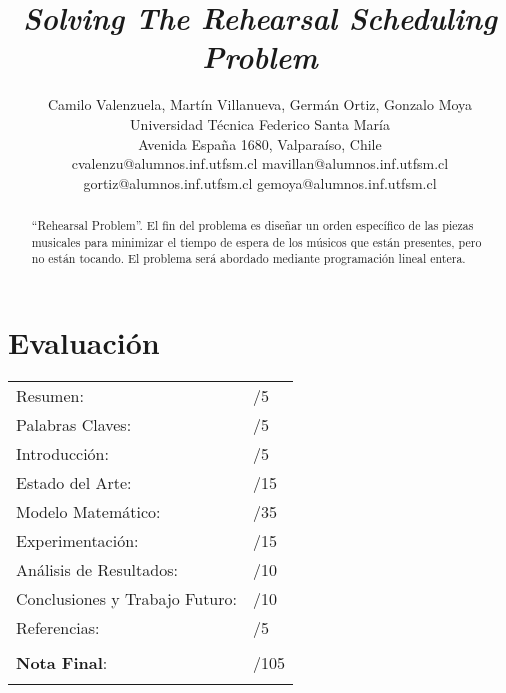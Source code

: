 \documentclass[journal, 10pt]{IEEEtran}
\begin{document}
\title{\textit{Solving The Rehearsal Scheduling Problem}}
\author{Camilo Valenzuela, Martín Villanueva, Germán Ortiz, Gonzalo Moya \\ Universidad Técnica Federico Santa María \\
Avenida España 1680, Valparaíso, Chile \\
cvalenzu@alumnos.inf.utfsm.cl mavillan@alumnos.inf.utfsm.cl gortiz@alumnos.inf.utfsm.cl gemoya@alumnos.inf.utfsm.cl}
\maketitle

\section*{Evaluación}

\begin{tabular}{ll}
Resumen: & \underline{\hspace{0.5cm}}/5 \\
Palabras Claves: & \underline{\hspace{0.5cm}}/5 \\
Introducción: & \underline{\hspace{0.5cm}}/5 \\
Estado del Arte:  & \underline{\hspace{0.5cm}}/15 \\
Modelo Matemático: &  \underline{\hspace{0.5cm}}/35 \\
Experimentación: &  \underline{\hspace{0.5cm}}/15 \\
Análisis de Resultados: &  \underline{\hspace{0.5cm}}/10 \\
Conclusiones y Trabajo Futuro: &  \underline{\hspace{0.5cm}}/10 \\
Referencias: & \underline{\hspace{0.5cm}}/5 \\
 &  \\
\textbf{Nota Final}:   & \underline{\hspace{0.5cm}}/105 \\
&  \\
\end{tabular}

\begin{abstract}
\boldmath ``Rehearsal Problem''. El fin del problema es diseñar un orden específico de las piezas musicales para minimizar el tiempo de espera de los músicos que están presentes, pero no están tocando. El problema será abordado mediante programación lineal entera.
\end{abstract}
\end{document}

